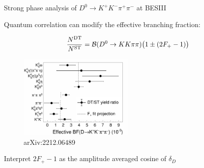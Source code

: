 \documentclass{beamer}
\begin{document}
\begin{frame}{Strong phase analysis of $D^0\to K^+K^-\pi^+\pi^-$ at BESIII}
  \begin{center}
    Quantum correlation can modify the effective branching fraction:
  \end{center}
  \begin{equation*}
    \frac{N^{\rm DT}}{N^{\rm ST}} = \mathcal{B}(D^0\to KK\pi\pi)\big(1\pm(2F_+ - 1)\big)
  \end{equation*}
  \begin{figure}
    \includegraphics[width = 0.50\textwidth]{Plots/CPeven_fraction_combination_CPtags.png}
    \caption*{\tiny arXiv:2212.06489}
  \end{figure}
  \begin{center}
    Interpret $2F_+ - 1$ as the amplitude averaged cosine of $\delta_D$
  \end{center}
\end{frame}
\end{document}
